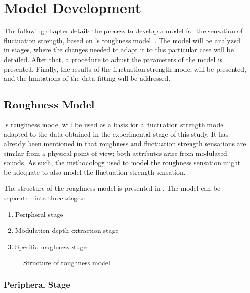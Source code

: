 \documentclass[../main.tex]{subfiles}
\begin{document}
\chapter{Model Development}
\label{cha:model}

\begin{modelchapter}

The following chapter details the process to develop a model for the sensation
of fluctuation strength, based on \citeauthor{daniel1997psychoacoustical}'s
roughness model~\cite{daniel1997psychoacoustical}. The model will be analyzed in
stages, where the changes needed to adapt it to this particular case will be
detailed. After that, a procedure to adjust the parameters of the model is
presented. Finally, the results of the fluctuation strength model will be
presented, and the limitations of the data fitting will be addressed.

\section{Roughness Model}

\citeauthor{daniel1997psychoacoustical}'s roughness model
\cite{daniel1997psychoacoustical}will be used as a basis for a fluctuation
strength model adapted to the data obtained in the experimental stage of this
study. It has already been mentioned in  that roughness
and fluctuation strength sensations are similar from a physical point of view;
both attributes arise from modulated sounds. As such, the methodology used to
model the roughness sensation might be adequate to also model the fluctuation
strength sensation.

The structure of the roughness model is presented in .
The model can be separated into three stages:
\begin{enumerate}
  \item Peripheral stage
  \item Modulation depth extraction stage
  \item Specific roughness stage
\end{enumerate}

\begin{figure}[!ht]
  \centering
  \resizebox{!}{15cm}{}
  \caption%
    {Structure of roughness model~\cite[pp.~116]{daniel1997psychoacoustical}}
\label{fig:roughness_model}
\end{figure}

\subsection{Peripheral Stage}


\end{modelchapter}
\end{document}
